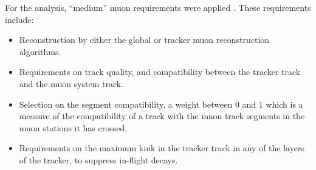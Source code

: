 For the \AHtotautau analysis, ``medium'' muon requirements were applied \cite{CMS-PAS-HIG-16-037}.
These requirements include:
\begin{itemize}
\setlength{\itemsep}{-0.5\baselineskip}
\item Reconstruction by either the global or tracker muon reconstruction algorithms.
\item Requirements on track quality, and compatibility between the tracker track and the muon system track.
\item Selection on the segment compatibility, a weight between 0 and 1 which is a measure of the compatibility
of a track with the muon track segments in the muon stations it has crossed.
\item Requirements on the maximum kink in the tracker track in any of the layers of the tracker, to suppress in-flight decays.
\end{itemize}

